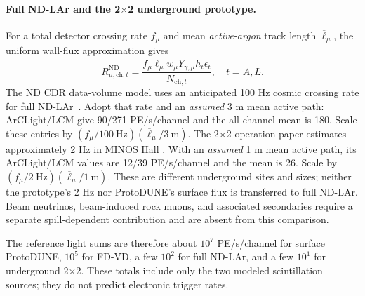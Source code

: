 \paragraph{Full ND-LAr and the 2$\times$2 underground prototype.}
For a total detector crossing rate $f_\mu$ and mean \emph{active-argon}
track length $\overline\ell_\mu$, the uniform wall-flux approximation gives
\begin{equation}
\boxed{R_{\mu,\mathrm{ch},t}^{\mathrm{ND}}
=\frac{f_\mu\overline\ell_\mu w_\mu Y_{\gamma,\mu}
h_t\epsilon_t}{N_{\mathrm{ch},t}},\quad t=A,L.}
\label{eq:NDmu}
\end{equation}
The ND CDR data-volume model uses an anticipated 100 Hz cosmic crossing
rate for full ND-LAr~\cite{nd_cdr}. Adopt that rate and an \emph{assumed}
3 m mean active path: ArCLight/LCM give 90/271 PE/s/channel and the
all-channel mean is 180. Scale these entries by
$(f_\mu/100\ \mathrm{Hz})(\overline\ell_\mu/3\ \mathrm m)$.
The 2$\times$2 operation paper estimates approximately 2 Hz in MINOS Hall
\cite{nd_operation}. With an \emph{assumed} 1 m mean active path, its
ArCLight/LCM values are 12/39 PE/s/channel and the mean is 26. Scale by
$(f_\mu/2\ \mathrm{Hz})(\overline\ell_\mu/1\ \mathrm m)$.
These are different underground sites and sizes; neither the prototype's
2 Hz nor ProtoDUNE's surface flux is transferred to full ND-LAr.
Beam neutrinos, beam-induced rock muons, and associated secondaries require
 a separate spill-dependent contribution and are absent from this comparison.

The reference light sums are therefore about $10^7$ PE/s/channel for
surface ProtoDUNE, $10^5$ for FD-VD, a few $10^2$ for full ND-LAr, and a
few $10^1$ for underground 2$\times$2. These totals include only the two
modeled scintillation sources; they do not predict electronic trigger rates.
